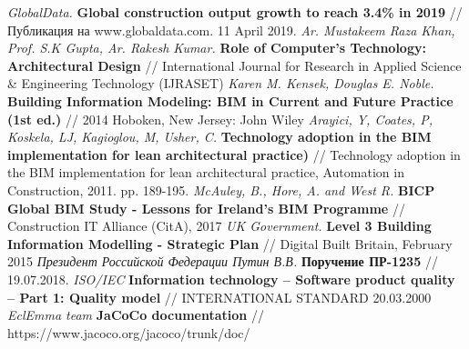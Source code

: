 \documentclass[a4paper,14pt]{extreport} %
\begin{document}
\begin{thebibliography}{1}
{\small
{} {\it GlobalData.}
\textbf{Global construction output growth to reach 3.4\% in 2019} // Публикация на www.globaldata.com. 11 April 2019.
 \textit{Ar. Mustakeem Raza Khan, Prof. S.K Gupta, Ar. Rakesh Kumar.}
\textbf{Role of Computer’s Technology: Architectural Design} // International Journal for Research in Applied Science \& Engineering Technology (IJRASET)
 {\it Karen M. Kensek, Douglas E. Noble.}
\textbf{Building Information Modeling: BIM in Current and Future Practice (1st ed.)} // 2014 Hoboken, New Jersey: John Wiley
 {\it Arayici, Y, Coates, P, Koskela, LJ, Kagioglou, M, Usher, C.}
\textbf{Technology adoption in the BIM implementation for lean architectural practice)} // Technology adoption in the BIM implementation for lean architectural practice, Automation in Construction, 2011. pp. 189-195.
 {\it McAuley, B., Hore, A. and West R.}
\textbf{BICP Global BIM Study - Lessons for Ireland’s BIM Programme} // Construction IT Alliance (CitA), 2017
 {\it UK Government.}
\textbf{Level 3 Building Information Modelling - Strategic Plan} // Digital Built Britain, February 2015
 {\it Президент Российской Федерации Путин В.В.}
\textbf{Поручение ПР-1235} // 19.07.2018.
 {\it ISO/IEC}
\textbf{Information technology -- Software product quality -- Part 1: Quality model} // INTERNATIONAL STANDARD 20.03.2000
 {\it EclEmma team}
\textbf{JaCoCo documentation} // https://www.jacoco.org/jacoco/trunk/doc/
}
\end{thebibliography}
\end{document}
